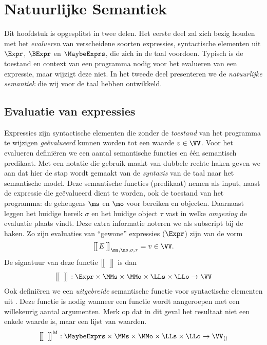 
\chapter{Natuurlijke Semantiek}

Dit hoofdstuk is opgesplitst in twee delen. Het eerste deel zal zich bezig houden met het \emph{evalueren} van verscheidene soorten expressies, syntactische elementen uit $\Expr$, $\BExpr$ en $\MaybeExprs$, die zich in de taal voordoen. Typisch is de toestand en context van een programma nodig voor het evalueren van een expressie, maar wijzigt deze niet. In het tweede deel presenteren we de \emph{natuurlijke semantiek} die wij voor de taal hebben ontwikkeld.

\section{Evaluatie van expressies}

Expressies zijn syntactische elementen die zonder de \emph{toestand} van het programma te wijzigen \emph{geëvalueerd} kunnen worden tot een waarde $v \in \VV$. 
Voor het evalueren definiëren we een aantal semantische functies en één semantisch predikaat. Met een notatie die gebruik maakt van dubbele rechte haken geven we aan dat hier de stap wordt gemaakt van de \emph{syntaxis} van de taal naar het semantische model. Deze semantische functies (predikaat) nemen als input, naast de expressie die geëvalueerd dient te worden, ook de toestand van het programma: de geheugens $\ms$ en $\mo$ voor bereiken en objecten. Daarnaast leggen het huidige bereik $\sigma$ en het huidige object $\tau$ vast in welke \emph{omgeving} de evaluatie plaats vindt. Deze extra informatie noteren we als subscript bij de haken. Zo zijn evaluaties van ``gewone'' expressies ($\Expr$) zijn van de vorm
%
\begin{equation*}
  \Express{E}{\ms,\mo,\sigma,\tau} = v \in \VV.
\end{equation*}
%
De signatuur van deze functie $\big[\!\big[\,\;\,\big]\!\big]^\text{}_{}$ is dan
%
\begin{equation*}
  \Express{\;}{} : \Expr \times \MMs \times \MMo \times \LLs \times \LLo \to \VV \\
\end{equation*}
%
Ook definiëren we een \emph{uitgebreide} semantische functie voor syntactische elementen uit \MaybeExprs. Deze functie is nodig wanneer een functie wordt aangeroepen met een willekeurig aantal argumenten. Merk op dat in dit geval het resultaat niet een enkele waarde is, maar een lijst van waarden.
%
\begin{equation*}
  \Express[M]{\;}{} : \MaybeExprs \times \MMs \times \MMo \times \LLs \times \LLo \to \VV_{\langle\rangle}
\end{equation*}

